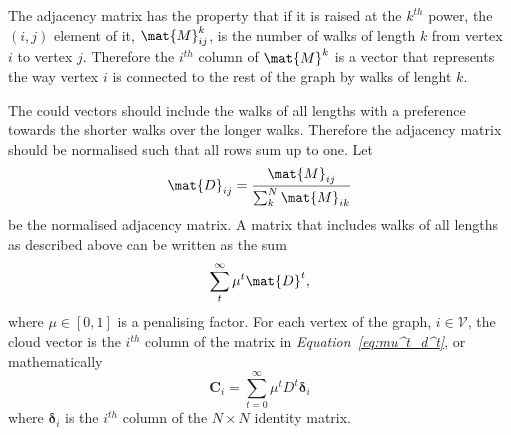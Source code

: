 \documentclass[12pt]{report}
\begin{document}
The adjacency matrix has the property that if it is raised at the $k^{th}$ power,
the $(i, j)$ element of it, $\mat{M}^k_{ij}$, is the number of walks of length
$k$ from vertex $i$ to vertex $j$. Therefore the $i^{th}$ column of $\mat{M}^k$
is a vector that represents the way vertex $i$ is connected to the rest of the
graph by walks of lenght $k$.

The could vectors should include the walks of all lengths with a preference
towards the shorter walks over the longer walks. Therefore the adjacency matrix
should be normalised such that all rows sum up to one. Let
%
\begin{equation}
\label{eq:initial-d}
\mat{D}_{ij} = \frac{\mat{M}_{ij}}{\sum_k^N \mat{M}_{ik}}
\end{equation}
be the normalised adjacency matrix. A matrix that includes walks of all lengths
as described above can be written as the sum
%
\begin{equation}
\label{eq:mu^t_d^t}
\sum_t^\infty \mu^t \mat{D}^t,
\end{equation}
%
where $\mu \in [0,1]$ is a penalising factor. For each vertex of the graph, $i
\in \mathcal{V}$, the cloud vector is the $i^{th}$ column of the matrix in
\emph{Equation~\ref{eq:mu^t_d^t}}, or mathematically
%
\begin{equation}
\label{eq:brute-ci}
\bm{C}_i = \sum_{t=0}^\infty \mu^t D^t \bm{\delta}_i
\end{equation}
%
where $\bm{\delta}_i$ is the $i^{th}$ column of the $N \times N$ identity matrix.
\end{document}
